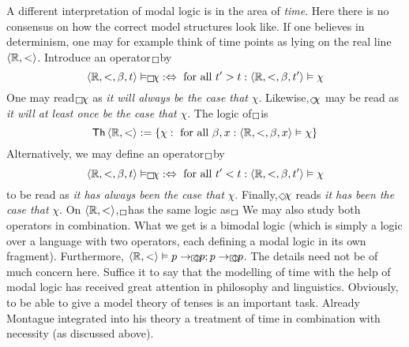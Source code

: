 A different interpretation of modal logic is in the area of
{\it time}. Here there is no consensus on how the correct model
structures look like. If one believes in determinism, one may
for example think of time points as lying on the real line
$\langle \mathbb{R}, <\rangle$. Introduce an operator $\qrechts$ by
\index{$\qrechts$, $\rechts$, $\qlinks$, $\links$}%
\begin{equation}
\auf \BR, <, \beta, t\zu \vDash \qrechts\, \chi
    :\Dpf \mbox{ for all } t' > t:
    \auf \BR, <, \beta, t'\zu \vDash \chi
\end{equation}
One may read $\qrechts\,\chi$ as {\it it will always be the case
that\/} $\chi$. Likewise, $\rechts\chi$ may be read as
{\it it will at least once be the case that\/} $\chi$.
The logic of $\qrechts$ is
\begin{equation}
\mathsf{Th}\, \langle \mathbb{R}, <\rangle := \{\chi : \mbox{ for all
    }\beta, x:
    \langle \mathbb{R}, <, \beta, x\rangle \vDash \chi\}
\end{equation}
Alternatively, we may define an operator $\qlinks$ by
\begin{equation}
\auf \BR, <, \beta, t\zu \vDash \qlinks\, \chi
    :\Dpf \mbox{ for all } t' < t:
    \auf \BR, <, \beta, t'\zu \vDash \chi
\end{equation}
to be read as {\it it has always been the case that\/} $\chi$.
Finally, $\links\,\chi$ reads {\it it has been the case that\/}
$\chi$. On $\langle \mathbb{R}, <\rangle$, $\qlinks$ has the same logic as
$\qrechts$. We may also study both operators in combination.
What we get is a bimodal logic (which is simply a logic over
a language with two operators, each defining a modal logic in
its own fragment).  Furthermore, $\auf \mathbb{R}, <\zu \vDash
p \pf \qrechts\,\links\, p; p \pf \qlinks\, \rechts \, p$.
The details need not be of much concern here.  Suffice it to say
that the modelling of time with the help of modal logic has received
great attention in philosophy and linguistics. Obviously,
to be able to give a model theory of tenses is an important
task. Already Montague integrated into his theory a treatment
of time in combination with necessity (as discussed above).

